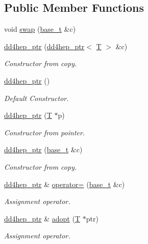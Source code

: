 \subsection*{Public Member Functions}
\begin{DoxyCompactItemize}
\item 
void \hyperlink{class_d_d4hep_1_1dd4hep__ptr_a9545ee3f6465afeefd98336c176529dd}{swap} (\hyperlink{class_d_d4hep_1_1dd4hep__ptr_a4bcbed2d2a920d0a5ffbf405263fe8d6}{base\_\-t} \&c)
\item 
\hyperlink{class_d_d4hep_1_1dd4hep__ptr_abac6ac3d2451af4916b051b66ed696ec}{dd4hep\_\-ptr} (\hyperlink{class_d_d4hep_1_1dd4hep__ptr}{dd4hep\_\-ptr}$<$ \hyperlink{class_t}{T} $>$ \&c)
\begin{DoxyCompactList}\small\item\em Constructor from copy. \item\end{DoxyCompactList}\item 
\hyperlink{class_d_d4hep_1_1dd4hep__ptr_a794418a47e2b889172eca52c9b42f2f9}{dd4hep\_\-ptr} ()
\begin{DoxyCompactList}\small\item\em Default Constructor. \item\end{DoxyCompactList}\item 
\hyperlink{class_d_d4hep_1_1dd4hep__ptr_ab9f2520963ed15270c9fbf034fbc15a9}{dd4hep\_\-ptr} (\hyperlink{class_t}{T} $\ast$p)
\begin{DoxyCompactList}\small\item\em Constructor from pointer. \item\end{DoxyCompactList}\item 
\hyperlink{class_d_d4hep_1_1dd4hep__ptr_a37f6577690b416db238cf3153dbb966e}{dd4hep\_\-ptr} (\hyperlink{class_d_d4hep_1_1dd4hep__ptr_a4bcbed2d2a920d0a5ffbf405263fe8d6}{base\_\-t} \&c)
\begin{DoxyCompactList}\small\item\em Constructor from copy. \item\end{DoxyCompactList}\item 
\hyperlink{class_d_d4hep_1_1dd4hep__ptr}{dd4hep\_\-ptr} \& \hyperlink{class_d_d4hep_1_1dd4hep__ptr_a08249cfe600aa0ad78b8871db6df8b4f}{operator=} (\hyperlink{class_d_d4hep_1_1dd4hep__ptr_a4bcbed2d2a920d0a5ffbf405263fe8d6}{base\_\-t} \&c)
\begin{DoxyCompactList}\small\item\em Assignment operator. \item\end{DoxyCompactList}\item 
\hyperlink{class_d_d4hep_1_1dd4hep__ptr}{dd4hep\_\-ptr} \& \hyperlink{class_d_d4hep_1_1dd4hep__ptr_aa6519c1c4d2d455b6b5cfad3318d5cc9}{adopt} (\hyperlink{class_t}{T} $\ast$ptr)
\begin{DoxyCompactList}\small\item\em Assignment operator. \item\end{DoxyCompactList}\end{DoxyCompactItemize}


